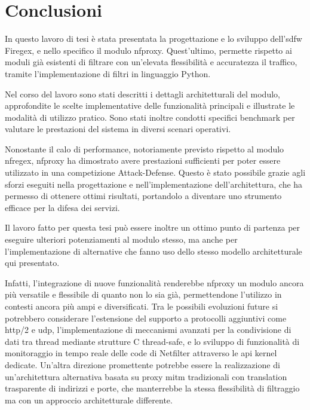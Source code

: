 \chapter*{Conclusioni}\label{chap:ending}

In questo lavoro di tesi è stata presentata la progettazione e lo sviluppo dell'\gls{sdfw} Firegex, e nello specifico il modulo \gls{nfproxy}. Quest'ultimo, permette rispetto ai moduli già esistenti di filtrare con un'elevata flessibilità e accuratezza il traffico, tramite l'implementazione di filtri in linguaggio Python.

Nel corso del lavoro sono stati descritti i dettagli architetturali del modulo, approfondite le scelte implementative delle funzionalità principali e illustrate le modalità di utilizzo pratico. Sono stati inoltre condotti specifici benchmark per valutare le prestazioni del sistema in diversi scenari operativi.

Nonostante il calo di performance, notoriamente previsto rispetto al modulo \gls{nfregex}, \gls{nfproxy} ha dimostrato avere prestazioni sufficienti per poter essere utilizzato in una competizione Attack-Defense. Questo è stato possibile grazie agli sforzi eseguiti nella progettazione e nell'implementazione dell'architettura, che ha permesso di ottenere ottimi risultati, portandolo a diventare uno strumento efficace per la difesa dei servizi.

Il lavoro fatto per questa tesi può essere inoltre un ottimo punto di partenza per eseguire ulteriori potenziamenti al modulo stesso, ma anche per l'implementazione di alternative che fanno uso dello stesso modello architetturale qui presentato.

Infatti, l'integrazione di nuove funzionalità renderebbe \gls{nfproxy} un modulo ancora più versatile e flessibile di quanto non lo sia già, permettendone l'utilizzo in contesti ancora più ampi e diversificati. Tra le possibili evoluzioni future si potrebbero considerare l'estensione del supporto a protocolli aggiuntivi come \gls{http}/2 e \gls{udp}, l'implementazione di meccanismi avanzati per la condivisione di dati tra thread mediante strutture C thread-safe, e lo sviluppo di funzionalità di monitoraggio in tempo reale delle code di Netfilter attraverso le \gls{api} kernel dedicate. Un'altra direzione promettente potrebbe essere la realizzazione di un'architettura alternativa basata su proxy \gls{mitm} tradizionali con translation trasparente di indirizzi e porte, che manterrebbe la stessa flessibilità di filtraggio ma con un approccio architetturale differente.

